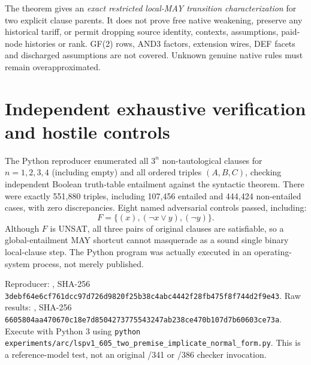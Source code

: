 \documentclass[11pt]{article}
\begin{document}
The theorem gives an \emph{exact restricted local-MAY transition characterization} for two explicit clause parents. It does not prove free native weakening, preserve any historical tariff, or permit dropping source identity, contexts, assumptions, paid-node histories or rank. GF(2) rows, AND3 factors, extension wires, DEF facets and discharged assumptions are not covered. Unknown genuine native rules must remain overapproximated.

\section*{Independent exhaustive verification and hostile controls}
The Python reproducer enumerated all $3^n$ non-tautological clauses for $n=1,2,3,4$ (including empty) and all ordered triples $(A,B,C)$, checking independent Boolean truth-table entailment against the syntactic theorem. There were exactly 551,880 triples, including 107,456 entailed and 444,424 non-entailed cases, with zero discrepancies. Eight named adversarial controls passed, including:
\[
F=\{(x),(\neg x\lor y),(\neg y)\}.
\]
Although $F$ is UNSAT, all three pairs of original clauses are satisfiable, so a global-entailment MAY shortcut cannot masquerade as a sound single binary local-clause step. The Python program was actually executed in an operating-system process, not merely published.

\noindent Reproducer: ,
SHA-256 \texttt{3debf64e6cf761dcc97d726d9820f25b38c4abc4442f28fb475f8f744d2f9e43}.
Raw results: ,
SHA-256 \texttt{6605804aa470670c18e7d8504273775543247ab238ce470b107d7b60603ce73a}.
Execute with Python 3 using \texttt{python experiments/arc/lspv1\_605\_two\_premise\_implicate\_normal\_form.py}.
This is a reference-model test, not an original /341 or /386 checker invocation.
\end{document}
